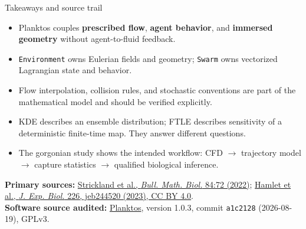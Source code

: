\documentclass[aspectratio=169,11pt]{beamer}
\newcommand{\code}[1]{\texttt{#1}}
\begin{document}
\begin{frame}{Takeaways and source trail}
\begin{itemize}
  \item Planktos couples \textbf{prescribed flow}, \textbf{agent behavior}, and \textbf{immersed geometry} without agent-to-fluid feedback.
  \item \code{Environment} owns Eulerian fields and geometry; \code{Swarm} owns vectorized Lagrangian state and behavior.
  \item Flow interpolation, collision rules, and stochastic conventions are part of the mathematical model and should be verified explicitly.
  \item KDE describes an ensemble distribution; FTLE describes sensitivity of a deterministic finite-time map. They answer different questions.
  \item The gorgonian study shows the intended workflow: CFD $\rightarrow$ trajectory model $\rightarrow$ capture statistics $\rightarrow$ qualified biological inference.
\end{itemize}
\vspace{0.3em}
{\scriptsize
\textbf{Primary sources:}
\href{https://doi.org/10.1007/s11538-022-01027-1}{Strickland et al., \emph{Bull. Math. Biol.} 84:72 (2022)};
\href{https://doi.org/10.1242/jeb.244520}{Hamlet et al., \emph{J. Exp. Biol.} 226, jeb244520 (2023), CC BY 4.0}.\\[2pt]
\textbf{Software source audited:}
\href{https://github.com/mountaindust/Planktos}{Planktos}, version 1.0.3, commit \code{a1c2128} (2026-08-19), GPLv3.
}
\end{frame}
\end{document}
